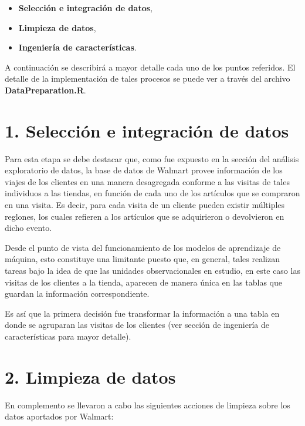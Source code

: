 \documentclass[]{book}
\providecommand{\tightlist}{%
  \setlength{\itemsep}{0pt}\setlength{\parskip}{0pt}}
\begin{document}
\begin{itemize}
\tightlist
\item
  \textbf{Selección e integración de datos},
\item
  \textbf{Limpieza de datos},
\item
  \textbf{Ingeniería de características}.
\end{itemize}

A continuación se describirá a mayor detalle cada uno de los puntos referidos. El detalle de la implementación de tales procesos se puede ver a través del archivo \textbf{DataPreparation.R}.

\hypertarget{selecciuxf3n-e-integraciuxf3n-de-datos}{%
\section{1. Selección e integración de datos}\label{selecciuxf3n-e-integraciuxf3n-de-datos}}

Para esta etapa se debe destacar que, como fue expuesto en la sección del análisis exploratorio de datos, la base de datos de Walmart provee información de los viajes de los clientes en una manera desagregada conforme a las visitas de tales individuos a las tiendas, en función de cada uno de los artículos que se compraron en una visita. Es decir, para cada visita de un cliente pueden existir múltiples reglones, los cuales refieren a los artículos que se adquirieron o devolvieron en dicho evento.

Desde el punto de vista del funcionamiento de los modelos de aprendizaje de máquina, esto constituye una limitante puesto que, en general, tales realizan tareas bajo la idea de que las unidades observacionales en estudio, en este caso las visitas de los clientes a la tienda, aparecen de manera única en las tablas que guardan la información correspondiente.

Es así que la primera decisión fue transformar la información a una tabla en donde se agruparan las visitas de los clientes (ver sección de ingeniería de características para mayor detalle).

\hypertarget{limpieza-de-datos}{%
\section{2. Limpieza de datos}\label{limpieza-de-datos}}

En complemento se llevaron a cabo las siguientes acciones de limpieza sobre los datos aportados por Walmart:
\end{document}
